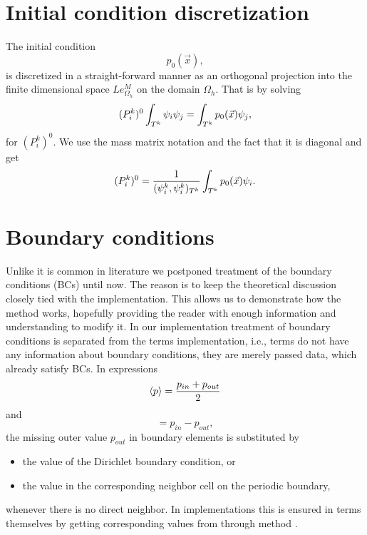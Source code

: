 \section{Initial condition discretization}
The initial condition
$$
p_0(\vec{x}),
$$
is discretized in a straight-forward manner as an orthogonal projection into the
finite dimensional space $Le_{\Omega_h}^{M}$ on the domain $\Omega_h$. That is
by solving
\begin{equation}
\label{eq:init_proj}
(P^k_i)^0\int_{T^k}\psi_i\psi_j = \int_{T^k} p_0(\vec{x})\psi_j,
\end{equation}
for $(P^k_i)^0$. We use the mass matrix notation and the fact that
it is diagonal and get
\begin{equation}
(P^k_i)^0 = \frac{1}{(\psi^k_i,\psi^k_i)_{T^k}}\int_{T^k} p_0(\vec{x})\psi_i.
\end{equation}

\section{Boundary conditions}
Unlike it is common in literature we postponed treatment of the boundary conditions (BCs)
until now. The reason is to keep the theoretical discussion
closely tied with the implementation. This allows us to demonstrate how the method works,
hopefully providing the reader with enough information and understanding to modify it. In
our implementation treatment of boundary conditions is separated from the terms implementation,
i.e., terms do not have any information about boundary conditions, they are merely passed
data, which already satisfy BCs.
In expressions
\begin{equation}
\langle p\rangle = \frac{p_{in} + p_{out}}{2}
\end{equation}
and
\begin{equation}
[p] = p_{in} - p_{out},
\end{equation}
the missing outer value $p_{out}$ in boundary elements is substituted by
\begin{itemize}
    \item the value of the Dirichlet boundary condition, or
    \item the value in the corresponding neighbor cell on the periodic boundary,
\end{itemize}
whenever there is no direct neighbor.
In implementations this is ensured in terms themselves by getting corresponding values
from  through method .

